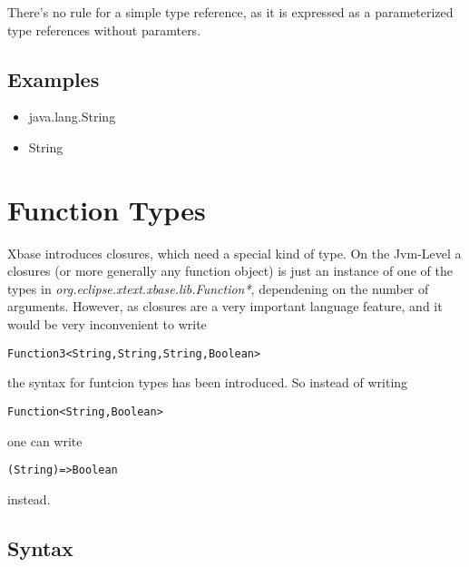 \documentclass[a4paper,10pt]{scrreprt}
\newlength{\itemindentlen}
\begin{document}
There's no rule for a simple type reference, as it is expressed as a parameterized type references without paramters.




\subsection{ Examples }


\setlength{\itemindentlen}{\textwidth}
\begin{itemize}
\addtolength{\itemindentlen}{-2em}

\item \begin{minipage}[t]{\itemindentlen}
java.lang.String
\end{minipage}

\item \begin{minipage}[t]{\itemindentlen}
String
\end{minipage}

\end{itemize}
\addtolength{\itemindentlen}{2em}







\section{Function Types}
\label{FunctionTypes}

Xbase introduces closures, which need a special kind of type. On the Jvm-Level a closures (or more generally any function object) is just an instance of one of the 
types in \emph{org.eclipse.xtext.xbase.lib.Function*}, dependening on the number of arguments. However, as closures are a very important language feature, and
it would be very inconvenient to write 
\begin{lstlisting}
Function3<String,String,String,Boolean>
\end{lstlisting}
 the syntax for funtcion types has been introduced. 
So instead of writing 
\begin{lstlisting}
Function<String,Boolean>
\end{lstlisting}
 one can write 
\begin{lstlisting}
(String)=>Boolean
\end{lstlisting}
 instead.

\subsection{ Syntax }
\end{document}
